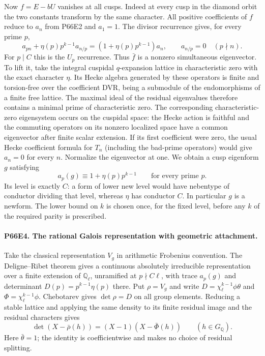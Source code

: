 Now $f=E-bU$ vanishes at all cusps. Indeed at every cusp in the
diamond orbit the two constants transform by the same character.
All positive coefficients of $f$ reduce to $a_n$ from P66E2 and
$a_1=1$. The divisor recurrence gives, for every prime $p$,
\[
 a_{pn}+\eta(p)p^{k-1}a_{n/p}
       =(1+\eta(p)p^{k-1})a_n ,
 \qquad a_{n/p}=0\quad(p\nmid n).
\]
For $p\mid C$ this is the $U_p$ recurrence. Thus $\bar f$ is a
nonzero simultaneous eigenvector. To lift it, take the integral
cuspidal $q$-expansion lattice in characteristic zero with the exact
character $\eta$. Its Hecke algebra generated by these operators
is finite and torsion-free over the coefficient DVR, being a
submodule of the endomorphisms of a finite free lattice. The
maximal ideal of the residual eigenvalues therefore contains a
minimal prime of characteristic zero. The corresponding characteristic-zero
eigensystem occurs on the cuspidal space: the Hecke action is faithful
and the commuting operators on its nonzero localized space have a
common eigenvector after finite scalar extension. If its first
coefficient were zero, the usual Hecke coefficient formula for
$T_n$ (including the bad-prime operators) would give $a_n=0$
for every $n$. Normalize the eigenvector at one. We obtain a cusp
eigenform $g$ satisfying
\[
       a_p(g)\equiv1+\eta(p)p^{k-1}\qquad\text{for every prime }p .
\]
Its level is exactly $C$: a form of lower new level would have
nebentype of conductor dividing that level, whereas $\eta$ has
conductor $C$. In particular $g$ is a newform. The lower bound on
$k$ is chosen once, for the fixed level, before any $k$ of the
required parity is prescribed.

\paragraph{P66E4. The rational Galois representation with geometric attachment.}
Take the classical representation $V_g$ in arithmetic Frobenius
convention. The Deligne--Ribet theorem gives a continuous absolutely
irreducible representation over a finite extension of $\mathbb Q_\ell$,
unramified at $p\nmid C\ell$, with trace $a_p(g)$ and determinant
$D(p)=p^{k-1}\eta(p)$ there. Put $\rho=V_g$ and write
$D=\chi_\ell^{k-1}\phi\theta$ and $\Phi=\chi_\ell^{k-1}\phi$.
Chebotarev gives $\det\rho=D$ on all group elements. Reducing a
stable lattice and applying the same density to its finite residual
image and the residual characters gives
\[
 \det(X-\bar\rho(h))=(X-1)(X-\bar\Phi(h))
 \qquad(h\in G_{\mathbb Q}).
\]
Here $\bar\theta=1$; the identity is coefficientwise and makes
no choice of residual splitting.

